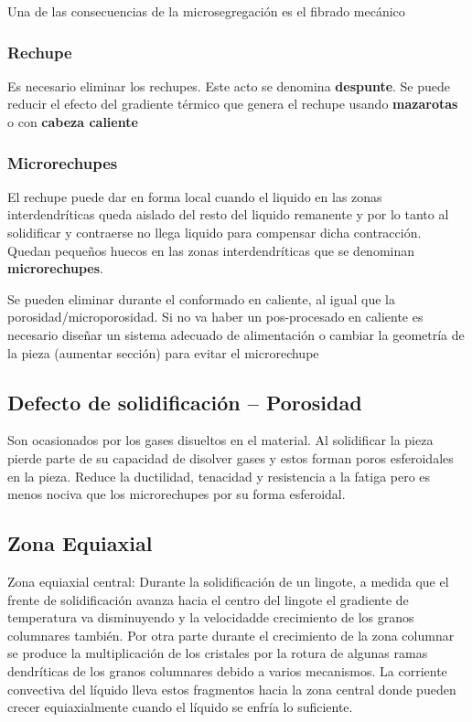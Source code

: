 Una de las consecuencias de la microsegregación es el fibrado mecánico

\subsubsection{Rechupe}
Es necesario eliminar los rechupes. Este acto se denomina \textbf{despunte}. Se puede reducir el efecto del gradiente térmico que genera el rechupe usando \textbf{mazarotas} o con \textbf{cabeza caliente}


\subsubsection{Microrechupes}

El rechupe puede dar en forma local cuando el liquido en las zonas interdendríticas queda aislado del resto del liquido remanente y por lo tanto al solidificar y contraerse no llega liquido para compensar dicha contracción. Quedan pequeños huecos en las zonas interdendríticas que se denominan \textbf{microrechupes}.

Se pueden eliminar durante el conformado en caliente, al igual que la porosidad/microporosidad. Si no va haber un pos-procesado en caliente es necesario diseñar un sistema adecuado de alimentación o cambiar la geometría de la pieza (aumentar sección) para evitar el microrechupe


\subsection[Porosidad]{Defecto de solidificación -- Porosidad}
Son ocasionados por los gases disueltos en el material. Al solidificar la pieza pierde parte de su capacidad de disolver gases y estos forman poros esferoidales en la pieza. Reduce la ductilidad, tenacidad y resistencia a la fatiga pero es menos nociva que los microrechupes por su forma esferoidal.


\subsection{Zona Equiaxial}
Zona equiaxial central: Durante la solidificación de un lingote, a medida que el frente de solidificación avanza hacia el centro del lingote el gradiente de temperatura va disminuyendo y la velocidadde crecimiento de los granos columnares también. Por otra parte durante el crecimiento de la zona columnar se produce la multiplicación de los cristales por la rotura de algunas ramas dendríticas de los granos columnares debido a varios mecanismos. La corriente convectiva del líquido lleva estos fragmentos hacia la zona central donde pueden crecer equiaxialmente cuando el líquido se enfría lo suficiente. 

